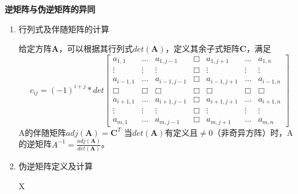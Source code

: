 \item{\textbf{逆矩阵与伪逆矩阵的异同}}\label{q1.1}

\begin{enumerate}
\item{行列式及伴随矩阵的计算}

给定方阵$\mathbf{A}$，可以根据其行列式$\mathit{det}(\mathbf{A})$，定义其余子式矩阵$\mathbf{C}$，满足
\begin{equation*}
c_{ij} = (-1)^{i+j} * \mathit{det}\begin{bmatrix}
a_{1,1} & \dots & a_{1,j-1} & \Box & a_{1,j+1} & \dots & a_{1,n} \\
\vdots & \vdots & \vdots & \Box & \vdots & \vdots & \vdots \\
a_{i-1,1} & \dots  & a_{i-1,j-1} & \Box & a_{i-1,j+1} & \dots  & a_{i-1,n} \\
\Box & \Box & \Box & \Box & \Box & \Box & \Box \\
a_{i+1,1} & \dots  & a_{i+1,j-1} & \Box & a_{i+1,j+1} & \dots  & a_{i+1,n} \\
\vdots & \vdots & \vdots & \Box & \vdots & \vdots & \vdots \\
a_{m,1} & \dots & a_{m,j-1} & \Box & a_{m,j+1} & \dots & a_{m,n}
\end{bmatrix}
\end{equation*}
A的伴随矩阵$\mathit{adj}(\mathbf{A}) = \mathbf{C}^{T}$
当$\mathit{det}(\mathbf{A})$有定义且$\neq 0$（非奇异方阵）时，A的逆矩阵$A^{-1} = \frac{\mathit{adj}(\mathbf{A})}{\mathit{det}(\mathbf{A})}$。

\item{伪逆矩阵定义及计算}

X

\end{enumerate}
